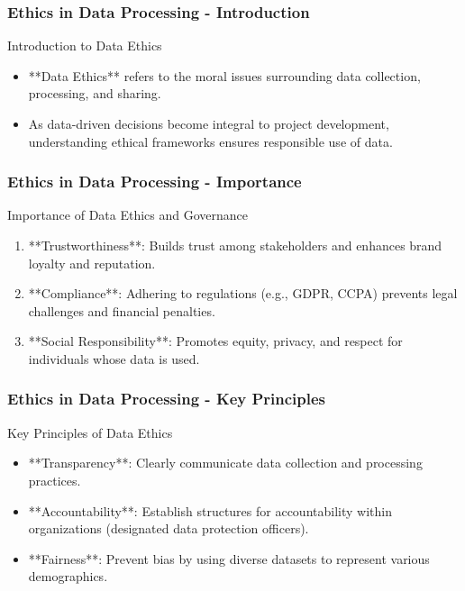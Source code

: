 \documentclass[aspectratio=169]{beamer}
\begin{document}
\begin{frame}[fragile]
    \frametitle{Ethics in Data Processing - Introduction}
    \begin{block}{Introduction to Data Ethics}
        \begin{itemize}
            \item **Data Ethics** refers to the moral issues surrounding data collection, processing, and sharing.
            \item As data-driven decisions become integral to project development, understanding ethical frameworks ensures responsible use of data.
        \end{itemize}
    \end{block}
\end{frame}

\begin{frame}[fragile]
    \frametitle{Ethics in Data Processing - Importance}
    \begin{block}{Importance of Data Ethics and Governance}
        \begin{enumerate}
            \item **Trustworthiness**: Builds trust among stakeholders and enhances brand loyalty and reputation.
            \item **Compliance**: Adhering to regulations (e.g., GDPR, CCPA) prevents legal challenges and financial penalties.
            \item **Social Responsibility**: Promotes equity, privacy, and respect for individuals whose data is used.
        \end{enumerate}
    \end{block}
\end{frame}

\begin{frame}[fragile]
    \frametitle{Ethics in Data Processing - Key Principles}
    \begin{block}{Key Principles of Data Ethics}
        \begin{itemize}
            \item **Transparency**: Clearly communicate data collection and processing practices.
            \item **Accountability**: Establish structures for accountability within organizations (designated data protection officers).
            \item **Fairness**: Prevent bias by using diverse datasets to represent various demographics.
        \end{itemize}
    \end{block}
\end{frame}
\end{document}
